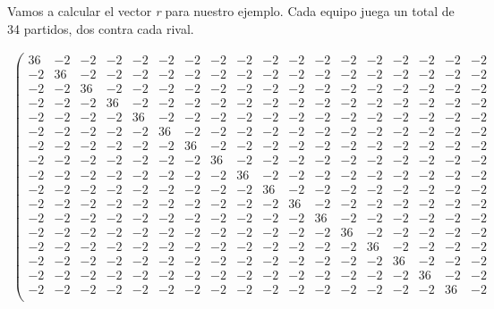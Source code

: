 \begin{ejem} Vamos a calcular el vector \textit{r} para nuestro ejemplo. Cada equipo juega un total de 34 partidos, dos contra cada rival.\end{ejem}
	{\tiny \[
		\begin{array}{ccccccccccccccccccccc} 
		\left(\begin{array}{cccccccccccccccccc}
		36 & -2 & -2 & -2 & -2 & -2 & -2 & -2 & -2 & -2 & -2 & -2 & -2 & -2 & -2 & -2 & -2 & -2\\
		-2 & 36 & -2 & -2 & -2 & -2 & -2 & -2 & -2 & -2 & -2 & -2 & -2 & -2 & -2 & -2 & -2 & -2\\
		-2 & -2 & 36 & -2 & -2 & -2 & -2 & -2 & -2 & -2 & -2 & -2 & -2 & -2 & -2 & -2 & -2 & -2\\
		-2 & -2 & -2 & 36 & -2 & -2 & -2 & -2 & -2 & -2 & -2 & -2 & -2 & -2 & -2 & -2 & -2 & -2\\
		-2 & -2 & -2 & -2 & 36 & -2 & -2 & -2 & -2 & -2 & -2 & -2 & -2 & -2 & -2 & -2 & -2 & -2\\
		-2 & -2 & -2 & -2 & -2 & 36 & -2 & -2 & -2 & -2 & -2 & -2 & -2 & -2 & -2 & -2 & -2 & -2\\
		-2 & -2 & -2 & -2 & -2 & -2 & 36 & -2 & -2 & -2 & -2 & -2 & -2 & -2 & -2 & -2 & -2 & -2\\
		-2 & -2 & -2 & -2 & -2 & -2 & -2 & 36 & -2 & -2 & -2 & -2 & -2 & -2 & -2 & -2 & -2 & -2\\
		-2 & -2 & -2 & -2 & -2 & -2 & -2 & -2 & 36 & -2 & -2 & -2 & -2 & -2 & -2 & -2 & -2 & -2\\
		-2 & -2 & -2 & -2 & -2 & -2 & -2 & -2 & -2 & 36 & -2 & -2 & -2 & -2 & -2 & -2 & -2 & -2\\
		-2 & -2 & -2 & -2 & -2 & -2 & -2 & -2 & -2 & -2 & 36 & -2 & -2 & -2 & -2 & -2 & -2 & -2\\
		-2 & -2 & -2 & -2 & -2 & -2 & -2 & -2 & -2 & -2 & -2 & 36 & -2 & -2 & -2 & -2 & -2 & -2\\
		-2 & -2 & -2 & -2 & -2 & -2 & -2 & -2 & -2 & -2 & -2 & -2 & 36 & -2 & -2 & -2 & -2 & -2\\
		-2 & -2 & -2 & -2 & -2 & -2 & -2 & -2 & -2 & -2 & -2 & -2 & -2 & 36 & -2 & -2 & -2 & -2\\
		-2 & -2 & -2 & -2 & -2 & -2 & -2 & -2 & -2 & -2 & -2 & -2 & -2 & -2 & 36 & -2 & -2 & -2\\
		-2 & -2 & -2 & -2 & -2 & -2 & -2 & -2 & -2 & -2 & -2 & -2 & -2 & -2 & -2 & 36 & -2 & -2\\ 
		-2 & -2 & -2 & -2 & -2 & -2 & -2 & -2 & -2 & -2 & -2 & -2 & -2 & -2 & -2 & -2 & 36 & -2\\ 

\end{array}
\end{array}\]}
